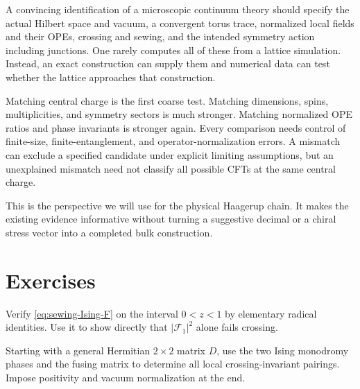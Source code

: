 A convincing identification of a microscopic continuum theory
should specify the actual Hilbert space and vacuum, a convergent
torus trace, normalized local fields and their OPEs, crossing and
sewing, and the intended symmetry action including junctions.
One rarely computes all of these from a lattice simulation.
Instead, an exact construction can supply them and numerical
data can test whether the lattice approaches that construction.

Matching central charge is the first coarse test. Matching
dimensions, spins, multiplicities, and symmetry sectors is much
stronger. Matching normalized OPE ratios and phase invariants is
stronger again. Every comparison needs control of finite-size,
finite-entanglement, and operator-normalization errors. A mismatch
can exclude a specified candidate under explicit limiting
assumptions, but an unexplained mismatch need not classify all
possible CFTs at the same central charge.

This is the perspective we will use for the physical Haagerup
chain. It makes the existing evidence informative without turning
a suggestive decimal or a chiral stress vector into a completed
bulk construction.

\section{Exercises}

\begin{exercise}\label{ex:sewing-Ising}
Verify \eqref{eq:sewing-Ising-F} on the interval $0<z<1$ by
elementary radical identities. Use it to show directly that
$|\mathcal F_1|^2$ alone fails crossing.

\par\smallskip{}\par
\end{exercise}

\begin{exercise}\label{ex:sewing-pairing}
Starting with a general Hermitian $2\times2$ matrix $D$, use
the two Ising monodromy phases and the fusing matrix to determine
all local crossing-invariant pairings. Impose positivity and
vacuum normalization at the end.

\par\smallskip{}\par
\end{exercise}

